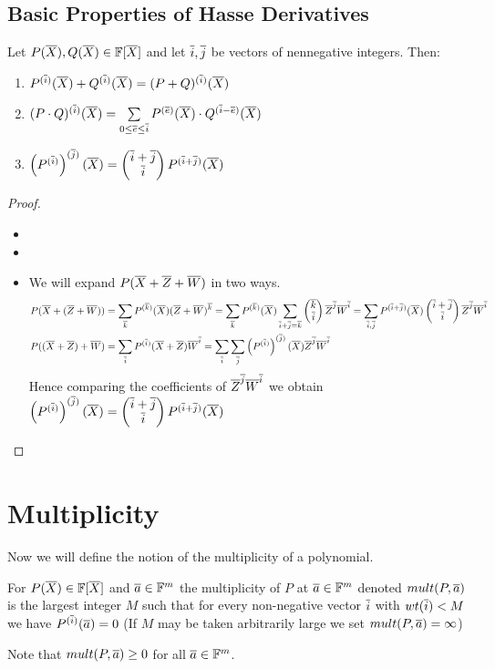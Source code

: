 \subsection{Basic Properties of Hasse Derivatives}
\begin{proposition}\label{hasseprop}
	Let $P(\ovX), Q(\ovX)\in \bbF[\ovX]$ and let $\ovi, \ovj$ be vectors of nennegative integers. Then:\begin{enumerate}
		\item $P^{(\ovi)}(\ovX)+Q^{(\ovi)}(\ovX)=(P+Q)^{(\ovi)}(\ovX)$
		\item $(P\cdot Q)^{(\ovi)}(\ovX)=\sum\limits_{0\leq \ove\leq \ovi}P^{(\ove)}(\ovX)\cdot Q^{(\ovi-\ove)}(\ovX)$
		\item $\lt(P^{(\ovi)}\rt)^{(\ovj)}(\ovX)=\comb{\ovi+\ovj}{\ovi} P^{(\ovi+\ovj)}(\ovX)$
	\end{enumerate}
\end{proposition}
\begin{proof}
	\begin{itemize}
		\item 
		\item 
		\item We will expand $P(\ovX+\ovZ+\ovW)$ in two ways. \begin{align*}
			P(\ovX+(\ovZ+\ovW)) &= \sum_{\ovk} P^{(\ovk)}(\ovX)(\ovZ+\ovW)^{\ovk}  = \sum_{\ovk}P^{(\ovk)}(\ovX)\sum_{\ovi+\ovj=\ovk}\comb{\ovk}{\ovi}\ovZ^{\ovj}\ovW^{\ovi} = \sum_{\ovi,\ovj}P^{(\ovi+\ovj)}(\ovX)\comb{\ovi+\ovj}{\ovi}\ovZ^{\ovj}\ovW^{\ovi}\\
			P((\ovX+\ovZ)+\ovW) &=\sum_{\ovi}P^{(\ovi)}(\ovX+\ovZ)\ovW^{\ovi}=\sum_{\ovi}\sum_{\ovj}\lt(P^{(\ovi)}\rt)^{(\ovj)}(\ovX)\ovZ^{\ovj}\ovW^{\ovi}
		\end{align*}
		Hence  comparing the coefficients of $\ovZ^{\ovj}\ovW^{\ovi}$ we obtain $\lt(P^{(\ovi)}\rt)^{(\ovj)}(\ovX)=\comb{\ovi+\ovj}{\ovi}P^{(\ovi+\ovj)}(\ovX)$
	\end{itemize}
\end{proof}

\section{Multiplicity}
Now we will define the notion of the multiplicity of a polynomial.
\begin{definition}[Multiplicity]
	For $P(\ovX)\in \bbF[\ovX]$ and $\ova\in \bbF^m$ the multiplicity of $P$ at $\ova\in \bbF^m$ denoted $mult(P,\ova)$ is the largest integer $M$ such that for every non-negative vector $\ovi$ with $wt(\ovi)<M$ we have $P^{(\ovi)}(\ova)=0$ (If $M$ may be taken arbitrarily large we set $mult(P,\ova)=\infty$)
\end{definition}
Note that $mult(P,\ova)\geq 0$ for all $\ova\in \bbF^m$.
